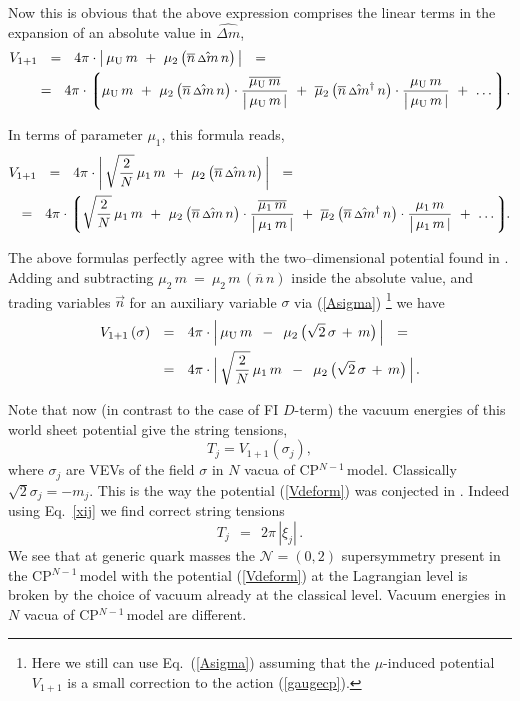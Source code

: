 \documentclass[12pt]{article}
\def\beq{\begin{equation}}
\def\eeq{\end{equation}}
\newcommand{\ntwoo}{${\mathcal N}= \left(0,2\right) $ }
\newcommand{\ov}{\overline}
\newcommand{\lgr}{\left\lgroup}
\newcommand{\rgr}{\right\rgroup}
\newcommand{\nbar}{\ov{n}}
\newcommand{\muU}{\mu_\text{U}}
\newcommand{\cpn}{CP$^{N-1}$\,}
\newcommand{\dm}{\hat{{\scriptstyle \Delta} m}}
\newcommand{\dmdag}{\hat{{\scriptstyle \Delta} m}{}^\dag}
\begin{document}
	Now this is obvious that the above expression comprises the linear terms in the expansion of
	an absolute value in $ \dm $,
\begin{align}
%
	&
	V_{1+1}    ~~=~~    4 \pi \cdot \big|\, \muU\, m  ~+~  \mu_2\, \big(\nbar\, \dm\, n\big) \,\big|    ~~=~~    
	\\
%
\notag
	&
	\quad~
	~~=~~
	4 \pi \cdot 
	\lgr
		\muU\, m  
		~+~
		\mu_2\, \big(\nbar\, \dm\, n\big) \cdot \frac{\ov{\muU\, m}}{\big|\, \muU\, m \,|}
		~+~
		\ov{\mu}{}_2\, \big(\nbar\, \dmdag\, n\big) \cdot \frac{\muU\, m}{\big|\, \muU\, m \,|}
		~+~
		\dots
	\rgr\!.
\end{align}

	In terms of parameter $ \mu_1 $, this formula reads,
\begin{align}
%
	&
	V_{1+1}    ~~=~~    4 \pi \cdot \bigg|\, \sqrt{\frac{2}{N}}\,\mu_1\, m  ~+~  \mu_2\, \big(\nbar\, \dm\, n\big) \,\bigg|    ~~=~~    
	\\
%
\notag
	&
	~~=~~
	4 \pi \cdot 
	\lgr
		\sqrt{\frac{2}{N}}\,\mu_1\, m  
		~+~
		\mu_2\, \big(\nbar\, \dm\, n\big) \cdot \frac{\ov{\mu_1\, m}}{\big|\, \mu_1\, m \,|}
		~+~
		\ov{\mu}{}_2\, \big(\nbar\, \dmdag\, n\big) \cdot \frac{\mu_1\, m}{\big|\, \mu_1\, m \,|}
		~+~
		\dots
	\rgr\!\!.
\end{align}

	The above formulas perfectly agree with the two--dimensional potential found in \cite{Shifman:2010kr}.
	Adding and subtracting $ \mu_2\, m ~=~ \mu_2\, m\, (\nbar\, n) $ inside the absolute value,
	and trading variables $ \vec{n} $ for an auxiliary variable $ \sigma $ via (\ref{Asigma}) \footnote{Here we still can use Eq.~(\ref{Asigma})
	assuming that the $\mu$-induced potential $V_{1+1}$ is a small correction to the action (\ref{gaugecp}).}
	we have
\begin{align}
%
	\notag
	V_{1+1}\, (\sigma)    & ~~=~~    4 \pi \cdot \Big|\, \muU\, m  \,~-~\,  \mu_2\, \big( \sqrt{2}\,\sigma \,+\, m \big) \,\Big|    ~~=~~    
	\\
%
\label{Vdeform}
	& ~~=~~
	4 \pi \cdot \Big|\, \sqrt{\frac{2}{N}}\,\mu_1\, m  \,~-~\,  \mu_2\, \big( \sqrt{2}\,\sigma \,+\, m \big) \,\Big|\,.
\end{align}

Note that now (in contrast to the case of FI $D$-term)
 the vacuum energies of this world sheet potential give  the string tensions,
 \beq
 T_j= V_{1+1}(\sigma_j),
 \label{tv}
 \eeq
 where $\sigma_j$ are VEVs of the field $\sigma$ in $N$ vacua of 
 \cpn model. Classically $\sqrt{2}\sigma_j=-m_j$. This is the way
 the potential (\ref{Vdeform}) was conjected in \cite{Shifman:2010kr}.
	Indeed using Eq.~\eqref{xij} we find correct string tensions
\beq
	T_j    ~~=~~    2\pi\, |\xi_j |\,.
\eeq
We see that at generic quark masses the \ntwoo supersymmetry
present in the \cpn model with the potential (\ref{Vdeform})
at the Lagrangian level  is  broken by the choice of vacuum 
already at the classical level. Vacuum energies in $N$ vacua
of \cpn model are different.
\end{document}
